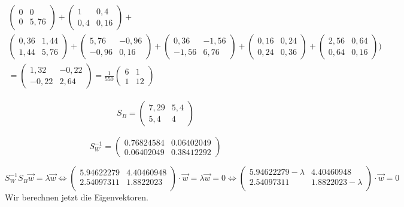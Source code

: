 \documentclass[a4paper,parskip=full-]{article}
\begin{document}
\begin{multline*}
\begin{pmatrix} 0 & 0 \\ 0 & 5,76 \end{pmatrix} +
\begin{pmatrix} 1 & 0,4 \\ 0,4 & 0,16 \end{pmatrix} + \\
\begin{pmatrix} 0,36 & 1,44 \\ 1,44 & 5,76 \end{pmatrix} +
\begin{pmatrix} 5,76 & -0,96 \\ -0,96 & 0,16 \end{pmatrix} +
\begin{pmatrix} 0,36 & -1,56 \\ -1,56 & 6,76 \end{pmatrix} +
\begin{pmatrix} 0,16 & 0,24 \\ 0,24 & 0,36 \end{pmatrix} +
\begin{pmatrix} 2,56 & 0,64 \\ 0,64 & 0,16 \end{pmatrix} \Biggr) \\
= \begin{pmatrix} 
1,32 & -0,22 \\ 
-0,22 & 2,64
\end{pmatrix} = \frac{1}{550}
\begin{pmatrix} 
6 & 1 \\ 1 & 12
\end{pmatrix}
\end{multline*}

\begin{multline*}
S_B = \begin{pmatrix} 7,29 & 5,4 \\ 5,4 & 4 \end{pmatrix}
\end{multline*}


$$
S_W^{-1} = \left(
\begin{array}{cc}
0.76824584 & 0.06402049 \\
0.06402049 & 0.38412292
\end{array}
\right)
$$

$$
S_W^{-1} S_B \vec{w} = \lambda \vec{w} \Leftrightarrow
\left(
\begin{array}{cc}
 5.94622279 &  4.40460948 \\
 2.54097311 &  1.8822023 \\
\end{array}
\right) \cdot \vec{w} = \lambda \vec{w} = 0 \Leftrightarrow
\left(
\begin{array}{cc}
 5.94622279 - \lambda & 4.40460948 \\
 2.54097311           & 1.8822023 - \lambda \\
\end{array}
\right) \cdot \vec{w} = 0
$$
Wir berechnen jetzt die Eigenvektoren.
\end{document}
